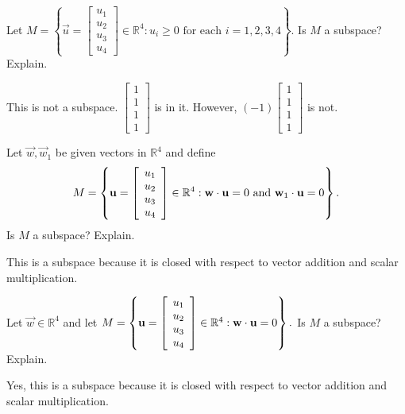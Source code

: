 \documentclass{ximera}
\begin{document}
\begin{problem}\label{prb:5.11} Let $M=\left\{ \vec{u}=\left[ \begin{array}{c}
u_{1} \\
u_{2} \\
u_{3} \\
u_{4}
\end{array}\right] \in
\mathbb{R}^{4}:u_{i}\geq 0\text{ for each }i=1,2,3,4\right\} .$ Is $M$ a
subspace? Explain.
\begin{hint}
This is not a subspace. $\left[ \begin{array}{r}
1 \\
1 \\
1 \\
1
\end{array}
\right] $
is in it. However, $\left( -1\right) \left[
\begin{array}{r}
1 \\
1 \\
1 \\
1
\end{array}
\right] $ is not.
\end{hint}
\end{problem}

\begin{problem}\label{prb:5.12} Let $\vec{w},\vec{w}_{1}$ be given vectors in $\mathbb{R}^{4}$ and define
\begin{equation*}
M=\left\{ \mathbf{u}=\left[ \begin{array}{c}
u_{1} \\
u_{2} \\
u_{3} \\
u_{4}
\end{array}\right] \in \mathbb{R}
^{4}:\mathbf{w}\cdot \mathbf{u}=0\text{ and }\mathbf{w}_{1}\cdot \mathbf{u}=0\right\}
.
\end{equation*}
Is $M$ a subspace? Explain.
\begin{hint}
This is a subspace because it is closed
with respect to vector addition and scalar multiplication.
\end{hint}
\end{problem}


\begin{problem}\label{prb:5.13} Let $\vec{w}\in \mathbb{R}^{4}$ and let $M=\left\{ \mathbf{u}
=\left[
\begin{array}{c}
u_{1} \\
u_{2} \\
u_{3} \\
u_{4}
\end{array}\right] \in \mathbb{R}^{4}:\mathbf{w}\cdot \mathbf{u}
=0\right\} .$ Is $M$ a subspace? Explain.
\begin{hint}
Yes, this is a subspace because it is closed with respect to vector addition and scalar multiplication.
\end{hint}
\end{problem}
\end{document}
